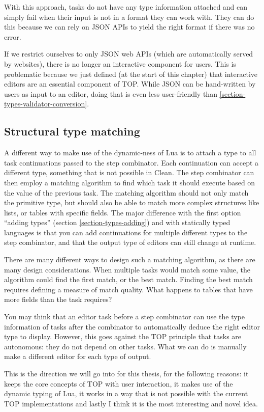 With this approach, tasks do not have any type information attached and can simply fail when their input is not in a format they can work with. They can do this because we can rely on JSON APIs to yield the right format if there was no error.

If we restrict ourselves to only JSON web APIs (which are automatically served by websites), there is no longer an interactive component for users. This is problematic because we just defined (at the start of this chapter) that interactive editors are an essential component of TOP. While JSON can be hand-written by users as input to an editor, doing that is even less user-friendly than \ref{section-types-validator-conversion}.

\subsection{Structural type matching}\label{section-types-matching}
A different way to make use of the dynamic-ness of Lua is to attach a type to all task continuations passed to the step combinator. Each continuation can accept a different type, something that is not possible in Clean.
The step combinator can then employ a matching algorithm to find which task it should execute based on the value of the previous task.
The matching algorithm should not only match the primitive type, but should also be able to match more complex structures like lists, or tables with specific fields. The major difference with the first option ``adding types'' (section \ref{section-types-adding}) and with statically typed languages is that you can add continuations for multiple different types to the step combinator, and that the output type of editors can still change at runtime.

There are many different ways to design such a matching algorithm, as there are many design considerations. When multiple tasks would match some value, the algorithm could find the first match, or the best match. Finding the best match requires defining a measure of match quality. What happens to tables that have more fields than the task requires?

You may think that an editor task before a step combinator can use the type information of tasks after the combinator to automatically deduce the right editor type to display. However, this goes against the TOP principle that tasks are autonomous: they do not depend on other tasks. What we can do is manually make a different editor for each type of output.

This is the direction we will go into for this thesis, for the following reasons:
it keeps the core concepts of TOP with user interaction,
it makes use of the dynamic typing of Lua,
it works in a way that is not possible with the current TOP implementations
and lastly I think it is the most interesting and novel idea.
